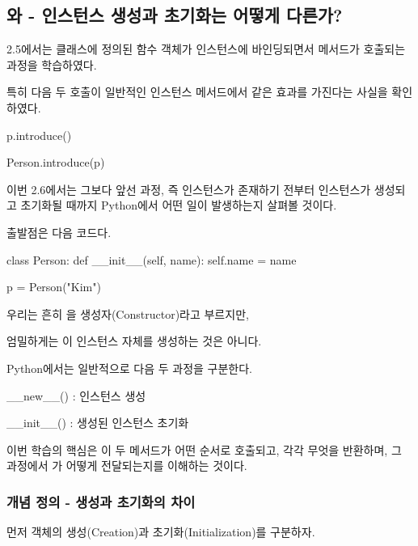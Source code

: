 

\subsection{와  - 인스턴스 생성과 초기화는 어떻게 다른가?}

2.5에서는 클래스에 정의된 함수 객체가 인스턴스에 바인딩되면서 메서드가 호출되는 과정을 학습하였다.

특히 다음 두 호출이 일반적인 인스턴스 메서드에서 같은 효과를 가진다는 사실을 확인하였다.

\begin{dhkcode}
p.introduce()

Person.introduce(p)
\end{dhkcode}

이번 2.6에서는 그보다 앞선 과정, 즉 인스턴스가 존재하기 전부터 인스턴스가 생성되고 초기화될 때까지 Python에서 어떤 일이 발생하는지 살펴볼 것이다.

출발점은 다음 코드다.

\begin{dhkcode}
class Person:
    def __init__(self, name):
        self.name = name


p = Person("Kim")
\end{dhkcode}

우리는 흔히 을 생성자(Constructor)라고 부르지만,

엄밀하게는 이 인스턴스 자체를 생성하는 것은 아니다.

Python에서는 일반적으로 다음 두 과정을 구분한다.

\begin{dhksmry}
    __new__() : 인스턴스 생성

    __init__() : 생성된 인스턴스 초기화
\end{dhksmry}

이번 학습의 핵심은 이 두 메서드가 어떤 순서로 호출되고, 각각 무엇을 반환하며, 그 과정에서 가 어떻게 전달되는지를 이해하는 것이다.

\subsubsection{개념 정의 - 생성과 초기화의 차이}

먼저 객체의 생성(Creation)과 초기화(Initialization)를 구분하자.

